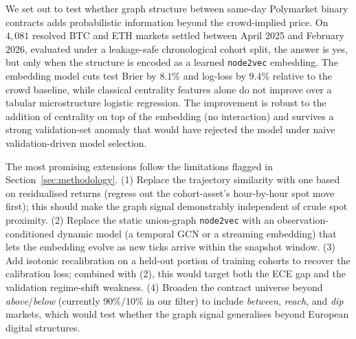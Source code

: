 \documentclass{article} %
\begin{document}
We set out to test whether graph structure between same-day Polymarket binary contracts adds probabilistic information beyond the crowd-implied price. On $4{,}081$ resolved BTC and ETH markets settled between April 2025 and February 2026, evaluated under a leakage-safe chronological cohort split, the answer is yes, but only when the structure is encoded as a learned \texttt{node2vec} embedding. The embedding model cuts test Brier by $8.1\%$ and log-loss by $9.4\%$ relative to the crowd baseline, while classical centrality features alone do not improve over a tabular microstructure logistic regression. The improvement is robust to the addition of centrality on top of the embedding (no interaction) and survives a strong validation-set anomaly that would have rejected the model under naive validation-driven model selection.

The most promising extensions follow the limitations flagged in Section~\ref{sec:methodology}. (1) Replace the trajectory similarity with one based on residualised returns (regress out the cohort-asset's hour-by-hour spot move first); this should make the graph signal demonstrably independent of crude spot proximity. (2) Replace the static union-graph \texttt{node2vec} with an observation-conditioned dynamic model (a temporal GCN or a streaming embedding) that lets the embedding evolve as new ticks arrive within the snapshot window. (3) Add isotonic recalibration on a held-out portion of training cohorts to recover the calibration loss; combined with (2), this would target both the ECE gap and the validation regime-shift weakness. (4) Broaden the contract universe beyond \emph{above}/\emph{below} (currently $90\%/10\%$ in our filter) to include \emph{between}, \emph{reach}, and \emph{dip} markets, which would test whether the graph signal generalises beyond European digital structures.

\end{document}
